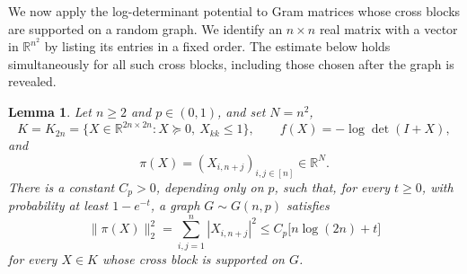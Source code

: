 \documentclass[11pt]{article}
\numberwithin{equation}{section}
\newtheorem{lemma}[theorem]{Lemma}
\theoremstyle{definition}
\theoremstyle{remark}
\newcommand{\R}{\mathbb R}
\begin{document}
We now apply the log-determinant potential to Gram matrices whose
cross blocks are supported on a random graph. We identify an
$n\times n$ real matrix with a vector in $\R^{n^2}$ by listing its
entries in a fixed order. The estimate below holds simultaneously
for all such cross blocks, including those chosen after the graph
is revealed.

\begin{lemma}\label{lem:potential-section}
Let $n\geq2$ and $p\in(0,1)$, and set $N=n^2$,
\[
 K=K_{2n}=\{X\in\R^{2n\times2n}:X\succeq0,\ X_{kk}\leq1\},
 \qquad f(X)=-\log\det(I+X),
\]
and
\[
 \pi(X)=(X_{i,n+j})_{i,j\in[n]}\in\R^N.
\]
There is a constant $C_p>0$, depending only on $p$, such that, for
every $t\geq0$, with probability at least $1-e^{-t}$, a graph
$G\sim G(n,p)$ satisfies
\begin{equation}\label{eq:potential-energy}
 \|\pi(X)\|_2^2
 =\sum_{i,j=1}^n|X_{i,n+j}|^2
 \leq C_p\bigl[n\log(2n)+t\bigr]
\end{equation}
for every $X\in K$ whose cross block is supported on $G$.
\end{lemma}
\end{document}
